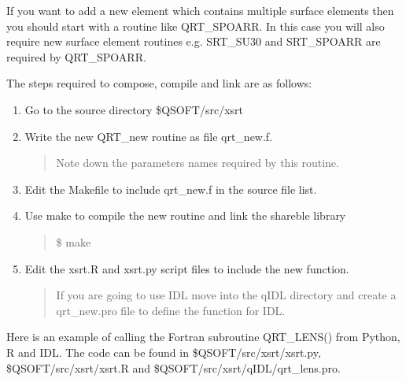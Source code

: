 \documentclass[letterpaper,10pt,english]{sphinxmanual}
\begin{document}
If you want to add a new element which contains multiple surface elements then
you should start with a routine like QRT\_SPOARR. In this case
you will also require
new surface element routines e.g. SRT\_SU30 and SRT\_SPOARR are
required by QRT\_SPOARR.

The steps required to compose, compile and link are as follows:
\begin{enumerate}
\def\theenumi{\arabic{enumi}}
\def\labelenumi{\theenumi .}
\makeatletter\def\p@enumii{\p@enumi \theenumi .}\makeatother
\item {} 
Go to the source directory \$QSOFT/src/xsrt

\item {} 
Write the new QRT\_new routine as file qrt\_new.f.
\begin{quote}

Note down the parameters names required by this routine.
\end{quote}

\item {} 
Edit the Makefile to include qrt\_new.f in the source file list.

\item {} 
Use make to compile the new routine and link the shareble library
\begin{quote}

\$ make
\end{quote}

\item {} 
Edit the xsrt.R and xsrt.py script files to include the new function.
\begin{quote}

If you are going to use IDL move into the qIDL directory and create
a qrt\_new.pro file to define the function for IDL.
\end{quote}

\end{enumerate}

Here is an example of calling the Fortran subroutine QRT\_LENS() from
Python, R and IDL. The code can be found in \$QSOFT/src/xsrt/xsrt.py,
\$QSOFT/src/xsrt/xsrt.R and \$QSOFT/src/xsrt/qIDL/qrt\_lens.pro.
\end{document}
